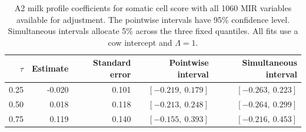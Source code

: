 \begin{table}[t]
\centering
\caption{A2 milk profile coefficients for somatic cell score with all 1060 MIR variables available for adjustment. The pointwise intervals have 95\% confidence level. Simultaneous intervals allocate 5\% across the three fixed quantiles. All fits use a cow intercept and $\Lambda=1$.}
\label{tab:milk-inference}
\begin{tabular}{rrrrr}
\toprule
$\tau$ & Estimate & Standard error & Pointwise interval & Simultaneous interval \\
\midrule
0.25 & -0.020 & 0.101 & $[-0.219,\ 0.179]$ & $[-0.263,\ 0.223]$ \\
0.50 & 0.018 & 0.118 & $[-0.213,\ 0.248]$ & $[-0.264,\ 0.299]$ \\
0.75 & 0.119 & 0.140 & $[-0.155,\ 0.393]$ & $[-0.216,\ 0.453]$ \\
\bottomrule
\end{tabular}
\end{table}
